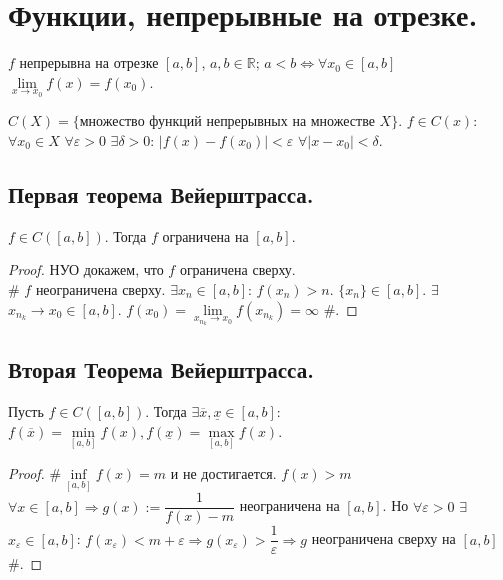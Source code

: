 \documentclass[12pt]{article}
\begin{document}
	\section{Функции, непрерывные на отрезке.}
	\begin{definition}
		$f$ непрерывна на отрезке $[a, b]$, $a, b \in \mathbb{R}$; $a < b \Leftrightarrow \forall x_0 \in [a, b]$ $\lim\limits_{x \rightarrow x_0} f(x) = f(x_0)$.
	\end{definition}
	\begin{note}
		$C(X) = \{ \text{множество функций непрерывных на множестве } X \}$. $f \in C(x)$: $\forall x_0 \in X$ $\forall \varepsilon > 0$ $\exists \delta > 0$: $|f(x) - f(x_0)| < \varepsilon$ $\forall |x - x_0| < \delta$.
	\end{note}
	\subsection{Первая теорема Вейерштрасса.}
	\begin{theorem}
		$f \in C([a, b])$. Тогда $f$ ограничена на $[a, b]$.
	\end{theorem}
	\begin{proof}
		НУО докажем, что $f$ ограничена сверху. \\
		$\#$ $f$ неограничена сверху.	$\exists x_n \in [a, b]$: $f(x_n) > n$.	$\{ x_n \} \in [a, b]$. $\exists$ $x_{n_k} \rightarrow x_0 \in [a, b]$. $f(x_0) = \lim\limits_{x_{n_k} \rightarrow x_0} f(x_{n_k}) = \infty$ $\#$.
	\end{proof}
	\subsection{Вторая Теорема Вейерштрасса.}
	\begin{theorem}
		Пусть $f \in C([a, b])$. Тогда $\exists \overline{x}, \underline{x} \in [a, b]$: $f(\overline{x}) = \min\limits_{[a, b]} f(x), f(\underline{x}) = \max\limits_{[a, b]} f(x)$.
	\end{theorem}
	\begin{proof}
		$\# \inf\limits_{[a, b]} f(x) = m$ и не достигается. $f(x) > m$ $\forall x \in [a, b] \Rightarrow g(x) := \dfrac{1}{f(x) - m}$ неограничена на $[a, b]$. Но $\forall \varepsilon > 0$ $\exists$ $x_{\varepsilon} \in [a, b]$: $f(x_{\varepsilon}) < m + \varepsilon \Rightarrow g(x_{\varepsilon}) > \dfrac{1}{\varepsilon} \Rightarrow g$ неограничена сверху на $[a, b]$ $\#$.
	\end{proof}
\end{document}
